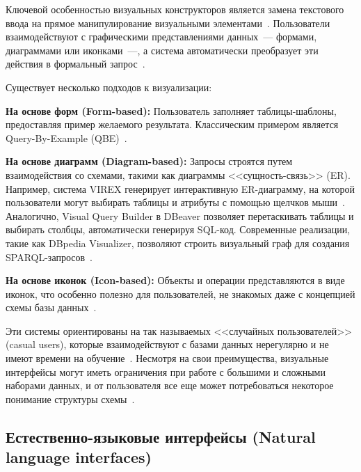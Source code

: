 Ключевой особенностью визуальных конструкторов является замена текстового ввода на прямое
манипулирование визуальными элементами~\cite{catarciVisualQuerySystems1996}. Пользователи
взаимодействуют с графическими представлениями данных~--- формами, диаграммами или иконками~---,
а система автоматически преобразует эти действия в формальный запрос~\cite{soumisVisualQueryBuilder2025,
      stigebornQueryBuilderDatabase2015}.

Существует несколько подходов к визуализации:
\begin{compactitem}
      \item \textbf{На основе форм (Form-based):} Пользователь заполняет таблицы-шаблоны,
      предоставляя пример желаемого результата. Классическим примером является
      Query-By-Example (QBE)~\cite{catarciVisualQuerySystems1997}.
      \item \textbf{На основе диаграмм (Diagram-based):} Запросы строятся путем взаимодействия со схемами,
      такими как диаграммы <<сущность-связь>> (ER). Например, система VIREX генерирует
      интерактивную ER-диаграмму, на которой пользователи могут выбирать таблицы и
      атрибуты с помощью щелчков мыши~\cite{loVIREXVRXQueryInteractive2010}.
      Аналогично, Visual Query Builder в DBeaver позволяет перетаскивать
      таблицы и выбирать столбцы, автоматически генерируя SQL-код.
      Современные реализации, такие как DBpedia Visualizer,
      позволяют строить визуальный граф для создания SPARQL-запросов~\cite{soumisVisualQueryBuilder2025}.
      \item \textbf{На основе иконок (Icon-based):} Объекты и операции представляются в виде иконок,
      что особенно полезно для пользователей, не знакомых даже с
      концепцией схемы базы данных~\cite{catarciVisualQuerySystems1997}.
\end{compactitem}

Эти системы ориентированы на так называемых <<случайных пользователей>> (casual users),
которые взаимодействуют с базами данных нерегулярно и
не имеют времени на обучение~\cite{catarciVisualQuerySystems1997, catarciVisualQuerySystems1996}.
Несмотря на свои преимущества, визуальные интерфейсы могут иметь ограничения при работе
с большими и сложными наборами данных, и от пользователя все еще может потребоваться
некоторое понимание структуры схемы~\cite{baskaranSyntaticSemanticVisual2013}.




\subsection{Естественно-языковые интерфейсы (Natural language interfaces)}

